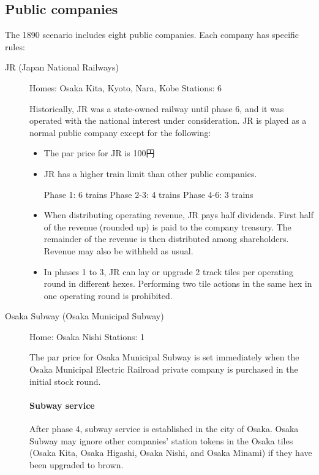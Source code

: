 \documentclass{article}
\begin{document}
\begin{CJK}{UTF8}{min}
\begin{multicols}{2}
\subsection{Public companies}

The 1890 scenario includes eight public companies. Each company has
specific rules:

\begin{description}
\item[JR (Japan National Railways)] \hfill

Homes: Osaka Kita, Kyoto, Nara, Kobe \hfill Stations: 6

Historically, JR was a state-owned railway until phase 6, and it was
operated with the national interest under consideration. JR is played
as a normal public company except for the following:
\begin{itemize}
\item The par price for JR is 100円

\item JR has a higher train limit than other public companies.

Phase 1: 6 trains
Phase 2-3: 4 trains
Phase 4-6: 3 trains

\item When distributing operating revenue, JR pays half
  dividends. First half of the revenue (rounded up) is paid to the
  company treasury. The remainder of the revenue is then distributed
  among shareholders. Revenue may also be withheld as usual.

\item In phases 1 to 3, JR can lay or upgrade 2 track tiles per
  operating round in different hexes. Performing two tile actions in
  the same hex in one operating round is prohibited.
\end{itemize}

\item[Osaka Subway (Osaka Municipal Subway)] \hfill

Home: Osaka Nishi \hfill Stations: 1

The par price for Osaka Municipal Subway is set immediately when the
Osaka Municipal Electric Railroad private company is purchased in the
initial stock round.

\paragraph{Subway service}
After phase 4, subway service is established in the city of
Osaka. Osaka Subway may ignore other companies' station tokens in the
Osaka tiles (Osaka Kita, Osaka Higashi, Osaka Nishi, and Osaka Minami)
if they have been upgraded to brown.


\end{description}
\end{multicols}
\end{CJK}
\end{document}
